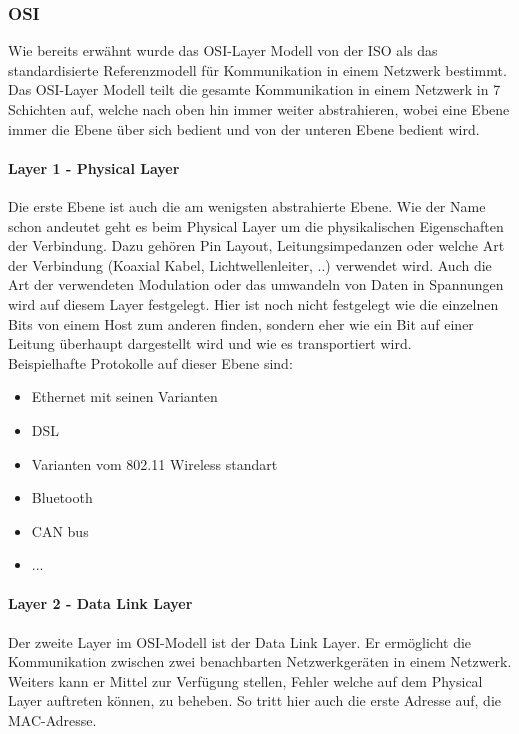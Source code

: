 \documentclass[12pt,a4paper]{report}
\begin{document}
\subsubsection{OSI}
Wie bereits erwähnt wurde das OSI-Layer Modell von der ISO als das standardisierte Referenzmodell für Kommunikation in einem Netzwerk bestimmt. Das OSI-Layer Modell teilt die gesamte Kommunikation in einem Netzwerk in 7 Schichten auf, welche nach oben hin immer weiter abstrahieren, wobei eine Ebene immer die Ebene über sich bedient und von der unteren Ebene bedient wird.\\
\paragraph{Layer 1 - Physical Layer}
Die erste Ebene ist auch die am wenigsten abstrahierte Ebene. Wie der Name schon andeutet geht es beim Physical Layer um die physikalischen Eigenschaften der Verbindung. Dazu gehören Pin Layout, Leitungsimpedanzen oder welche Art der Verbindung (Koaxial Kabel, Lichtwellenleiter, ..) verwendet wird. Auch die Art der verwendeten Modulation oder das umwandeln von Daten in Spannungen wird auf diesem Layer festgelegt. Hier ist noch nicht festgelegt wie die einzelnen Bits von einem Host zum anderen finden, sondern eher wie ein Bit auf einer Leitung überhaupt dargestellt wird und wie es transportiert wird.\\

Beispielhafte Protokolle auf dieser Ebene sind:
\begin{itemize}
\item Ethernet mit seinen Varianten
\item DSL 
\item Varianten vom 802.11 Wireless standart
\item Bluetooth
\item CAN bus
\item ...
\end{itemize}
\paragraph{Layer 2 - Data Link Layer}
Der zweite Layer im OSI-Modell ist der Data Link Layer. Er ermöglicht die Kommunikation zwischen zwei benachbarten Netzwerkgeräten in einem Netzwerk. Weiters kann er Mittel zur Verfügung stellen, Fehler welche auf dem Physical Layer auftreten können, zu beheben. So tritt hier auch die erste Adresse auf, die MAC-Adresse.\\
\end{document}
